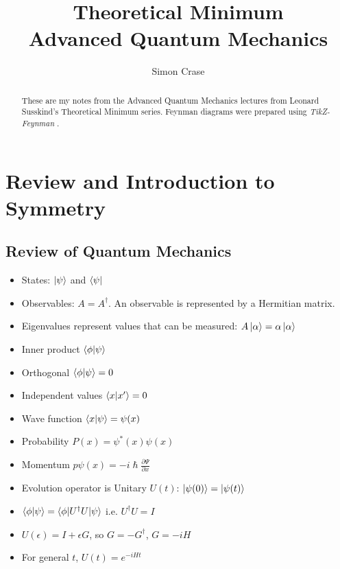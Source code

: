 \documentclass[]{article}
\title{Theoretical Minimum\\Advanced Quantum Mechanics}
\author{Simon Crase}
\begin{document}
\maketitle

\begin{abstract}
These are my notes from the Advanced Quantum Mechanics lectures\cite{susskind2013advanced}  from Leonard Susskind's Theoretical Minimum series\cite{susskind2007theoretical}. Feynman diagrams were prepared using \emph{TikZ-Feynman} \cite{ellis2016tikz}.
\end{abstract}

\tableofcontents
\listoffigures
\listoftables
\listoftheorems


\section{Review and Introduction to Symmetry}

\subsection{Review of Quantum Mechanics}

\begin{itemize}
	\item States: $\ket{\psi}$ and $\bra{\psi}$
	\item Observables: $A=A^{\dag}$. An observable is represented by a Hermitian matrix.
	\item Eigenvalues represent values that can be measured: $A\ket{\alpha} = \alpha\ket{\alpha}$
	\item Inner product $\braket{\phi|\psi}$	
	\item Orthogonal $\braket{\phi|\psi}=0$
	\item Independent values $\braket{x|x^{\prime}}=0$
	\item Wave function $\braket{x|\psi} = \psi(x)$
	\item Probability $P(x)=\psi^*(x)\psi(x)$
	\item Momentum $p\psi(x)=- i \hslash \frac{\partial \Psi}{\partial x}$
	\item Evolution operator is Unitary $U(t)$: $\ket{\psi(0)} = \ket{\psi(t)}$
	\item $\braket{\phi|\psi}=\braket{\phi|U^{\dagger}U|\psi}$ i.e. $U^{\dagger}U=I$
	\item $U(\epsilon)= I + \epsilon G$, so $G=-G^{\dagger}$, $G=- i H$
	\item For general $t$, $U(t)=e^{- i H t}$
\end{itemize}
\end{document}
